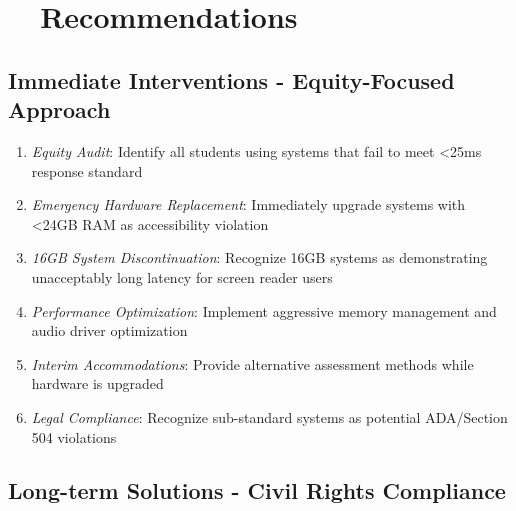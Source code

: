 \pagebreak

\hypertarget{recommendations}{}\section{~~Recommendations}\label{recommendations}

\subsection{Immediate Interventions - Equity-Focused Approach}\label{immediate-interventions-equity-focused-approach}

\begin{enumerate}
	\item \emph{Equity Audit}: Identify all students using systems that fail to meet <25ms response standard \supercite{EducationalEquityReport2024}
	\item \emph{Emergency Hardware Replacement}: Immediately upgrade systems with <24GB RAM as accessibility violation \supercite{ADA1990, Section504RehabAct}
	\item \emph{16GB System Discontinuation}: Recognize 16GB systems as demonstrating unacceptably long latency for screen reader users \supercite{EducationalEquityReport2024}
	\item \emph{Performance Optimization}: Implement aggressive memory management and audio driver optimization \supercite{SystemOptimizationGuides}
	\item \emph{Interim Accommodations}: Provide alternative assessment methods while hardware is upgraded \supercite{AccommodationsBestPractices}
	\item \emph{Legal Compliance}: Recognize sub-standard systems as potential ADA/Section 504 violations \supercite{ADA1990, Section504RehabAct}
\end{enumerate}

\subsection{Long-term Solutions - Civil Rights Compliance}\label{long-term-solutions-civil-rights-compliance}

